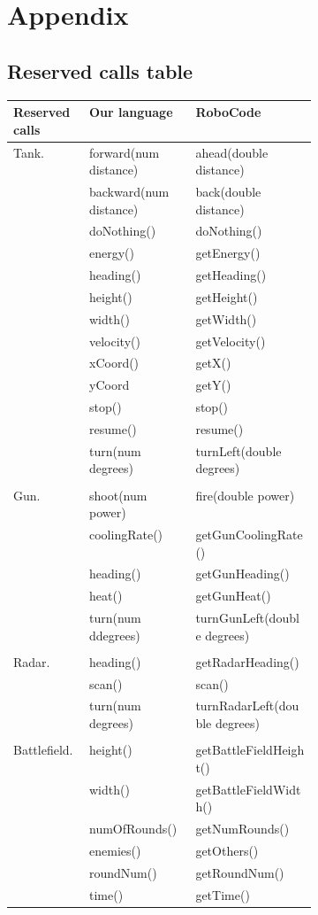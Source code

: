 \chapter{Appendix}
\section{Reserved calls table}
\begin{center}
    \begin{tabular}{ | l| l | p{0.4\linewidth} | }
    \hline
    Reserved calls & Our language & RoboCode \\ \hline
    Tank. & forward(num distance) & ahead(double distance)  \\ \hline
     & backward(num distance) & back(double distance)  \\ \hline
     & doNothing() & doNothing() \\ \hline
     & energy() & getEnergy() \\ \hline
     & heading() & getHeading() \\ \hline
     & height() & getHeight() \\ \hline
     & width() & getWidth()  \\ \hline
     & velocity() & getVelocity()  \\ \hline
     & xCoord() & getX() \\ \hline
     & yCoord & getY() \\ \hline
     & stop() & stop() \\ \hline
     & resume() & resume() \\ \hline
     & turn(num degrees) & turnLeft(double degrees)  \\ \hline
     & &  \\ \hline
    Gun. & shoot(num power) & fire(double power) \\ \hline
     & coolingRate() & getGunCoolingRate() \\ \hline
     & heading() & getGunHeading() \\ \hline
     & heat() & getGunHeat() \\ \hline
     & turn(num ddegrees) & turnGunLeft(double degrees)  \\ \hline
     & &  \\ \hline
    Radar. & heading() & getRadarHeading() \\ \hline
     & scan() & scan() \\ \hline
     & turn(num degrees) & turnRadarLeft(double degrees) \\ \hline
     & &  \\ \hline
    Battlefield. & height() & getBattleFieldHeight() \\ \hline
     & width() & getBattleFieldWidth() \\ \hline
     & numOfRounds() & getNumRounds() \\ \hline
     & enemies() & getOthers() \\ \hline
     & roundNum() & getRoundNum() \\ \hline
     & time() & getTime()  \\
    \hline
    \end{tabular}
\end{center}

